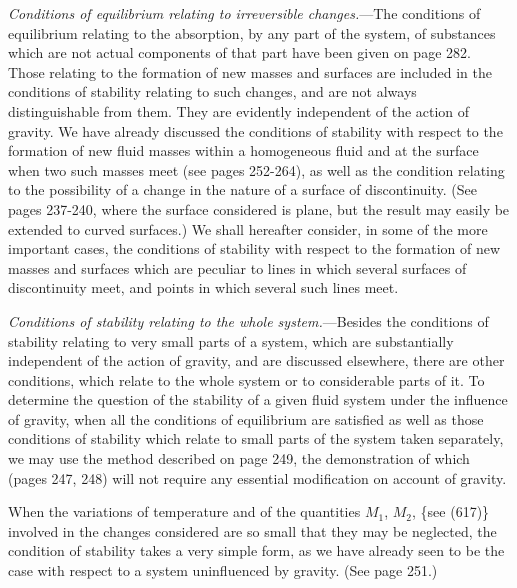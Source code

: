 \documentclass[12pt]{article}
\begin{document}
\textit{Conditions of equilibrium  relating to irreversible changes.}---The
conditions of equilibrium relating to the absorption, by any part of the system, of substances which are not actual components of that part have been given on page 282. Those relating to the formation of new masses and surfaces are included in the conditions of stability relating to such changes, and are not always distinguishable from them. They are evidently independent of the action of gravity. We have already discussed the conditions of stability with respect to the formation of new fluid masses within a homogeneous fluid and at the surface when two such masses meet (see pages 252-264), as well as the condition relating to the possibility of a change in the nature of a surface of discontinuity. (See pages 237-240, where the surface considered is plane, but the result may easily be extended to curved surfaces.) We shall hereafter consider, in some of the more important cases, the conditions of stability with respect to the formation of new masses and surfaces which are peculiar to lines in which several surfaces of discontinuity meet, and points in which several such lines meet.

\textit{Conditions of stability relating to the whole system.}---Besides the conditions of stability relating to very small parts of a system, which are substantially independent of the action of gravity, and are discussed elsewhere, there are other conditions, which relate to the whole system or to considerable parts of it. To determine the question of the stability of a given fluid system under the influence of gravity, when all the conditions of equilibrium are satisfied as well as those conditions of stability which relate to small parts of the system taken separately, we may use the method described on page 249, the demonstration of which (pages 247, 248) will not require any essential modification on account of gravity.

When the variations of temperature and of the quantities $M_1$, $M_2$,  \{see (617)\} involved in the changes considered are so small that they may be neglected, the condition of stability takes a very simple form, as we have already seen to be the case with respect to a system uninfluenced by gravity. (See page 251.)
\end{document}
